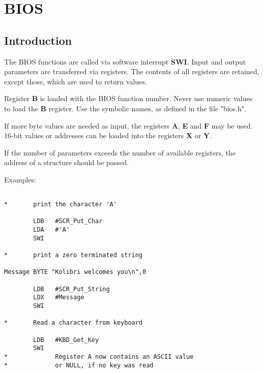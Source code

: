 \chapter{BIOS}

\section{Introduction}

The BIOS functions are called via software interrupt {\bf SWI}.
Input and output parameters are transferred via registers.
The contents of all registers are retained, except those,
which are used to return values.

Register {\bf B} is loaded with the BIOS function number.
Never use numeric values to load the {\bf B} register.
Use the symbolic names, as defined in the file "bios.h".

If more byte values are needed as input, the registers
{\bf A}, {\bf E} and {\bf F} may be used.
16-bit values or addresses can be loaded into the registers
{\bf X} or {\bf Y}.

If the number of parameters exceeds the number of available
registers, the address of a structure should be passed.

Examples:
\begin{verbatim}

*       print the character 'A'

        LDB   #SCR_Put_Char
        LDA   #'A'
        SWI

*       print a zero terminated string

Message BYTE "Kolibri welcomes you\n",0

        LDB   #SCR_Put_String
        LDX   #Message
        SWI

*       Read a character from keyboard

        LDB   #KBD_Get_Key
        SWI
*             Register A now contains an ASCII value
*             or NULL, if no key was read

\end{verbatim}

